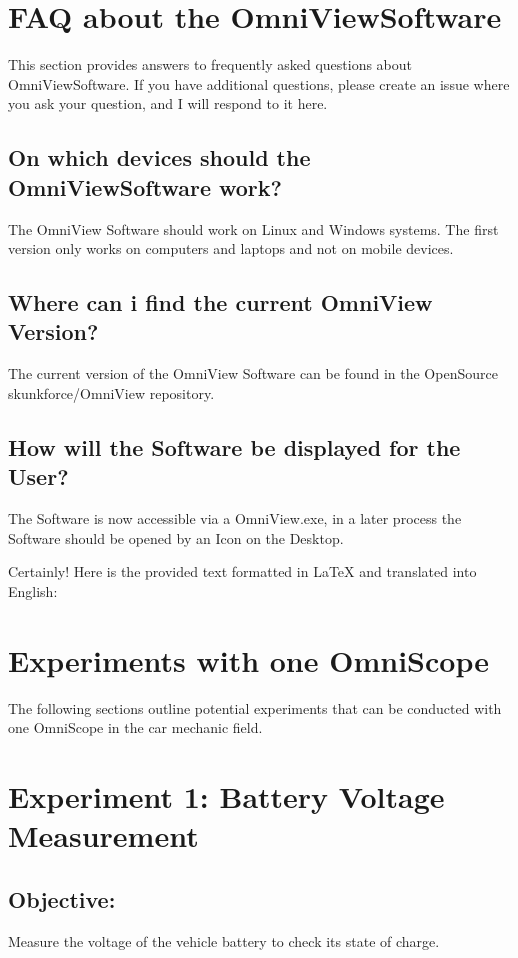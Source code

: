 \documentclass{scrreprt}
\begin{document}
\section{FAQ about the OmniViewSoftware}

This section provides answers to frequently asked questions about OmniViewSoftware. If you have additional questions, please create an issue where you ask your question, and I will respond to it here.

\subsection{On which devices should the OmniViewSoftware work?}

The OmniView Software should work on Linux and Windows systems. The first version only works on computers and laptops and not on mobile devices.

\subsection{Where can i find the current OmniView Version?}

The current version of the OmniView Software can be found in the OpenSource skunkforce/OmniView repository.

\subsection{How will the Software be displayed for the User?}

The Software is now accessible via a OmniView.exe, in a later process the Software should be opened by an Icon on the Desktop. 

Certainly! Here is the provided text formatted in LaTeX and translated into English:

\section{Experiments with one OmniScope}
The following sections outline potential experiments that can be conducted with one OmniScope in the car mechanic field. 

\section*{Experiment 1: Battery Voltage Measurement}
\subsection*{Objective:} Measure the voltage of the vehicle battery to check its state of charge.
\end{document}
